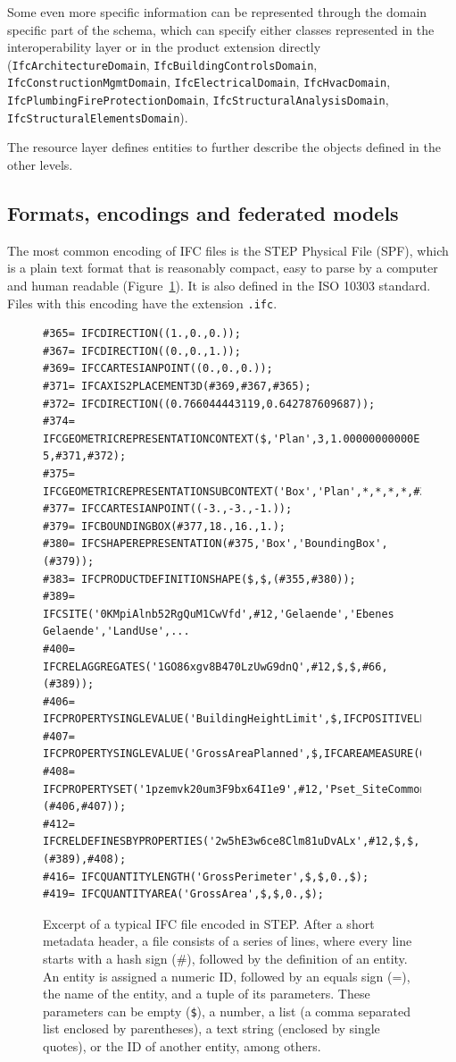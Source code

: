 Some even more specific information can be represented through the domain specific part of the schema, which can specify either classes represented in the interoperability layer or in the product extension directly (\texttt{IfcArchitectureDomain}, \texttt{IfcBuildingControlsDomain}, \texttt{Ifc\-Cons\-truc\-tion\-Mgmt\-Do\-main}, \texttt{IfcElectricalDomain}, \texttt{IfcHvacDomain}, \texttt{Ifc\-Plum\-bing\-Fire\-Pro\-tec\-tion\-Do\-main}, \texttt{Ifc\-Struc\-tu\-ral\-A\-na\-ly\-sis\-Do\-main}, \texttt{Ifc\-Struc\-tu\-ral\-E\-le\-ments\-Do\-main}).

The resource layer defines entities to further describe the objects defined in the other levels.

\subsection{Formats, encodings and federated models}

The most common encoding of IFC files is the STEP Physical File (SPF), which is a plain text format that is reasonably compact, easy to parse by a computer and human readable (Figure~\ref{fig:step}).
It is also defined in the ISO 10303 standard.
Files with this encoding have the extension \texttt{.ifc}.

\lstset{basicstyle=\footnotesize\ttfamily,breaklines=true}
\begin{figure}
\begin{lstlisting}[frame=single]
#365= IFCDIRECTION((1.,0.,0.));
#367= IFCDIRECTION((0.,0.,1.));
#369= IFCCARTESIANPOINT((0.,0.,0.));
#371= IFCAXIS2PLACEMENT3D(#369,#367,#365);
#372= IFCDIRECTION((0.766044443119,0.642787609687));
#374= IFCGEOMETRICREPRESENTATIONCONTEXT($,'Plan',3,1.00000000000E-5,#371,#372);
#375= IFCGEOMETRICREPRESENTATIONSUBCONTEXT('Box','Plan',*,*,*,*,#374,$,.PLAN_VIEW.,$);
#377= IFCCARTESIANPOINT((-3.,-3.,-1.));
#379= IFCBOUNDINGBOX(#377,18.,16.,1.);
#380= IFCSHAPEREPRESENTATION(#375,'Box','BoundingBox',(#379));
#383= IFCPRODUCTDEFINITIONSHAPE($,$,(#355,#380));
#389= IFCSITE('0KMpiAlnb52RgQuM1CwVfd',#12,'Gelaende','Ebenes Gelaende','LandUse',...
#400= IFCRELAGGREGATES('1GO86xgv8B470LzUwG9dnQ',#12,$,$,#66,(#389));
#406= IFCPROPERTYSINGLEVALUE('BuildingHeightLimit',$,IFCPOSITIVELENGTHMEASURE(9.),$);
#407= IFCPROPERTYSINGLEVALUE('GrossAreaPlanned',$,IFCAREAMEASURE(0.),$);
#408= IFCPROPERTYSET('1pzemvk20um3F9bx64I1e9',#12,'Pset_SiteCommon',$,(#406,#407));
#412= IFCRELDEFINESBYPROPERTIES('2w5hE3w6ce8Clm81uDvALx',#12,$,$,(#389),#408);
#416= IFCQUANTITYLENGTH('GrossPerimeter',$,$,0.,$);
#419= IFCQUANTITYAREA('GrossArea',$,$,0.,$);
\end{lstlisting}
\caption{Excerpt of a typical IFC file encoded in STEP\@.
After a short metadata header, a file consists of a series of lines, where every line starts with a hash sign (\#), followed by the definition of an entity.
An entity is assigned a numeric ID, followed by an equals sign (=), the name of the entity, and a tuple of its parameters.
These parameters can be empty (\texttt{\$}), a number, a list (a comma separated list enclosed by parentheses), a text string (enclosed by single quotes), or the ID of another entity, among others.}%
\label{fig:step}
\end{figure}

